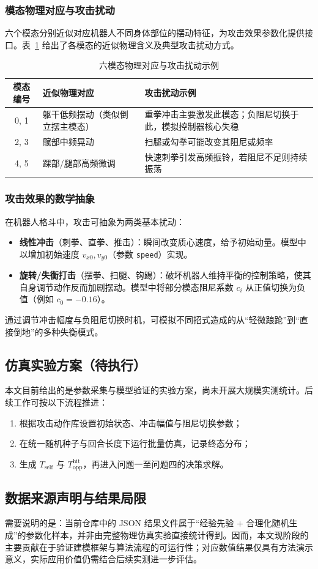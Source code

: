 \subsubsection{模态物理对应与攻击扰动}
六个模态分别近似对应机器人不同身体部位的摆动特征，为攻击效果参数化提供接口。表~\ref{tab:modes} 给出了各模态的近似物理含义及典型攻击扰动方式。
\begin{table}[H]
\centering
\caption{六模态物理对应与攻击扰动示例}
\label{tab:modes}
\begin{tabular}{c p{6cm} p{5cm}}
\toprule
模态编号 & 近似物理对应 & 攻击扰动示例 \\
\midrule
0, 1 & 躯干低频摆动（类似倒立摆主模态） & 重拳冲击主要激发此模态；负阻尼切换于此，模拟控制器核心失稳 \\
2, 3 & 髋部中频晃动 & 扫腿或勾拳可能改变其阻尼或频率 \\
4, 5 & 踝部/腿部高频微调 & 快速刺拳引发高频振铃，若阻尼不足则持续振荡 \\
\bottomrule
\end{tabular}
\end{table}

\subsubsection{攻击效果的数学抽象}
在机器人格斗中，攻击可抽象为两类基本扰动：
\begin{itemize}
\item \textbf{线性冲击}（刺拳、直拳、推击）：瞬间改变质心速度，给予初始动量。模型中以增加初始速度 $v_{x0}, v_{y0}$（参数 \texttt{speed}）实现。
\item \textbf{旋转/失衡打击}（摆拳、扫腿、钩踢）：破坏机器人维持平衡的控制策略，使其自身调节动作反而加剧摆动。模型中将部分模态阻尼系数 $c_i$ 从正值切换为负值（例如 $c_0 = -0.16$）。
\end{itemize}
通过调节冲击幅度与负阻尼切换时机，可模拟不同招式造成的从“轻微踉跄”到“直接倒地”的多种失衡模式。

\subsection{仿真实验方案（待执行）}
本文目前给出的是参数采集与模型验证的实验方案，尚未开展大规模实测统计。后续工作可按以下流程推进：
\begin{enumerate}[leftmargin=*]
    \item 根据攻击动作库设置初始状态、冲击幅值与阻尼切换参数；
    \item 在统一随机种子与回合长度下运行批量仿真，记录终态分布；
    \item 生成 $T_{\text{self}}$ 与 $T_{\text{opp}}^{\text{hit}}$，再进入问题一至问题四的决策求解。
\end{enumerate}

\subsection{数据来源声明与结果局限}
需要说明的是：当前仓库中的 JSON 结果文件属于“经验先验 + 合理化随机生成”的参数化样本，并非由完整物理仿真实验直接统计得到。因而，本文现阶段的主要贡献在于验证建模框架与算法流程的可运行性；对应数值结果仅具有方法演示意义，实际应用价值仍需结合后续实测进一步评估。
